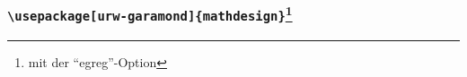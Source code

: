 \documentclass[12pt,ngerman]{beamer}
\begin{document}
\begin{frame}
\frametitle{\texttt{\textbackslash usepackage[urw-garamond]\{mathdesign\}}\footnote{mit der \enquote{egreg}-Option}}

\vspace*{-0.75cm}\begin{center}
\end{center}
\end{frame}
\end{document}
